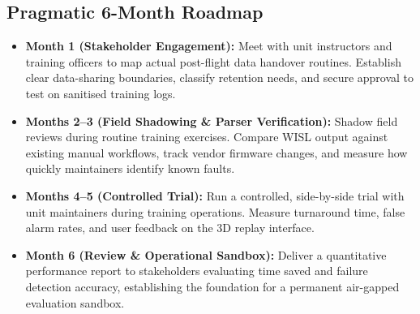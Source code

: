 \documentclass[11pt,a4paper]{article}
\begin{document}
\subsection{Pragmatic 6-Month Roadmap}
\begin{itemize}
    \item \textbf{\color{accent}Month 1 (Stakeholder Engagement):} Meet with unit instructors and training officers to map actual post-flight data handover routines. Establish clear data-sharing boundaries, classify retention needs, and secure approval to test on sanitised training logs.
    \item \textbf{\color{accent}Months 2--3 (Field Shadowing \& Parser Verification):} Shadow field reviews during routine training exercises. Compare WISL output against existing manual workflows, track vendor firmware changes, and measure how quickly maintainers identify known faults.
    \item \textbf{\color{accent}Months 4--5 (Controlled Trial):} Run a controlled, side-by-side trial with unit maintainers during training operations. Measure turnaround time, false alarm rates, and user feedback on the 3D replay interface.
    \item \textbf{\color{accent}Month 6 (Review \& Operational Sandbox):} Deliver a quantitative performance report to stakeholders evaluating time saved and failure detection accuracy, establishing the foundation for a permanent air-gapped evaluation sandbox.
\end{itemize}

\clearpage

\end{document}
